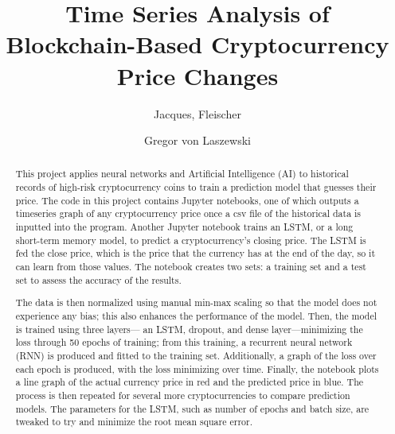 \documentclass[acmtog,authorversion]{acmart}
\newcommand{\TODO}[2]{\todo[inline]{#1: #2}}
\begin{document}
\title{Time Series Analysis of Blockchain-Based Cryptocurrency Price Changes}

\author{Jacques, Fleischer}

\author{Gregor von Laszewski}



\renewcommand{\shortauthors}{TBD, von Laszewski, et.al.}


\begin{abstract}
\TODO{jp}{do not use this project}
  This project applies neural networks and Artificial Intelligence (AI) to historical records of high-risk cryptocurrency coins to train a prediction model that guesses their price. The code in this project contains Jupyter notebooks, one of which outputs a timeseries graph of any cryptocurrency price once a csv file of the historical data is inputted into the program. Another Jupyter notebook trains an LSTM, or a long short-term memory model, to predict a cryptocurrency's closing price. The LSTM is fed the close price, which is the price that the currency has at the end of the day, so it can learn from those values. The notebook creates two sets: a training set and a test set to assess the accuracy of the results.

The data is then normalized using manual min-max scaling so that the model does not experience any bias; this also enhances the performance of the model. Then, the model is trained using three layers— an LSTM, dropout, and dense layer—minimizing the loss through 50 epochs of training; from this training, a recurrent neural network (RNN) is produced and fitted to the training set. Additionally, a graph of the loss over each epoch is produced, with the loss minimizing over time. Finally, the notebook plots a line graph of the actual currency price in red and the predicted price in blue. The process is then repeated for several more cryptocurrencies to compare prediction models. The parameters for the LSTM, such as number of epochs and batch size, are tweaked to try and minimize the root mean square error.
\end{abstract}
\end{document}
